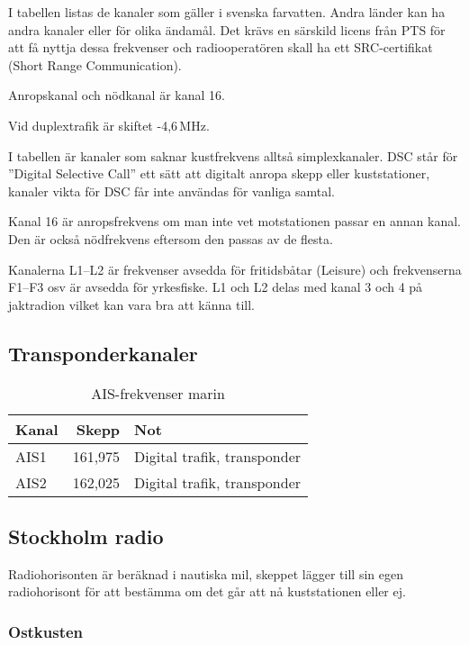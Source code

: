 {I tabellen listas de kanaler som gäller i svenska farvatten. Andra
länder kan ha andra kanaler eller för olika ändamål. Det krävs en
särskild licens från PTS för att få nyttja dessa frekvenser och
radiooperatören skall ha ett SRC-certifikat (Short Range
Communication).

Anropskanal och nödkanal är kanal 16.

Vid duplextrafik är skiftet -4,6\,MHz.

I tabellen är kanaler som saknar kustfrekvens alltså
simplexkanaler. DSC står för ''Digital Selective Call'' ett sätt att
digitalt anropa skepp eller kuststationer, kanaler vikta för DSC får
inte användas för vanliga samtal.

Kanal 16 är anropsfrekvens om man inte vet motstationen passar en
annan kanal. Den är också nödfrekvens eftersom den passas av de
flesta.

Kanalerna L1--L2 är frekvenser avsedda för fritidsbåtar (Leisure) och
frekvenserna F1--F3 osv är avsedda för yrkesfiske. L1 och L2 delas med
kanal 3 och 4 på jaktradion vilket kan vara bra att känna till.

\subsection{Transponderkanaler}

\begin{table}[h]
\centering
\begin{tabular}{lrl}
	\textbf{Kanal} & \textbf{Skepp} & \textbf{Not}                \\ \hline
	AIS1           &        161,975 & Digital trafik, transponder \\
	AIS2           &        162,025 & Digital trafik, transponder
\end{tabular}
\caption{AIS-frekvenser marin}
\end{table}

\subsection{Stockholm radio}

Radiohorisonten är beräknad i nautiska mil, skeppet lägger till sin egen
radiohorisont för att bestämma om det går att nå kuststationen eller ej.

\subsubsection{Ostkusten}

}
